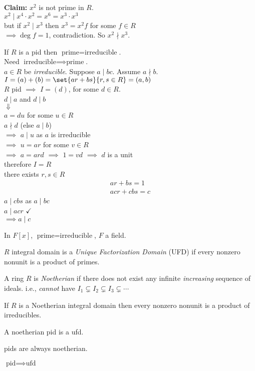 \textbf{Claim: } $x^2$ is not prime in $R$. \\
\pf $x^2\mid x^4\cdot x^2=x^6=x^3\cdot x^3$ \\
but if $x^2\mid x^3$ then $x^3=x^2f$ for some $f\in R$ \\
$\implies \deg f = 1$, contradiction.  So $x^2\nmid x^3$.

\prop If $R$ is a pid then $\text{prime}=\text{irreducible}$. \\
\pf Need $\text{irreducible}\implies\text{prime}$. \\
$a\in R$ be \emph{irreducible}.  Suppose $a\mid bc$.  Assume $a\nmid b$. \\
$I=(a)+(b)=\set{ar+bs}{r,s\in R}=(a,b)$ \\
$R$ pid $\implies$ $I=(d)$, for some $d\in R$. \\
$d\mid a$ and $d\mid b$ \\
$\Downarrow$ \\
$a=du$ for some $u\in R$ \\
$a \nmid d$ (else $a\mid b$) \\
$\implies$ $a\mid u$ as $a$ is irreducible \\
$\implies$ $u=ar$ for some $v\in R$ \\
$\implies$ $a=ard$ $\implies$ $1=vd$ $\implies$ $d$ is a unit \\
therefore $I=R$ \\
there exists $r,s\in R$
\begin{gather*}
ar + bs = 1 \\
acr + cbs = c
\end{gather*}
$a\mid cbs$ as $a\mid bc$ \\
$a\mid acr$ $\checkmark$ \\
$\implies a\mid c$

\cor In $F[x]$, $\text{prime}=\text{irreducible}$, $F$ a field.

 $R$ integral domain is a \emph{Unique Factorization Domain} (UFD) if every nonzero nonunit is a product of primes.

 A ring $R$ is \emph{Noetherian} if there does not exist any infinite \emph{increasing} sequence of ideals.  i.e., \emph{cannot} have $I_1\subsetneq I_2\subsetneq I_3\subsetneq\dotsb$

\thm If $R$ is a Noetherian integral domain then every nonzero nonunit is a product of irreducibles.

\cor A noetherian pid is a ufd.

\lem pids are always noetherian.

\cor $\text{pid}\implies\text{ufd}$
